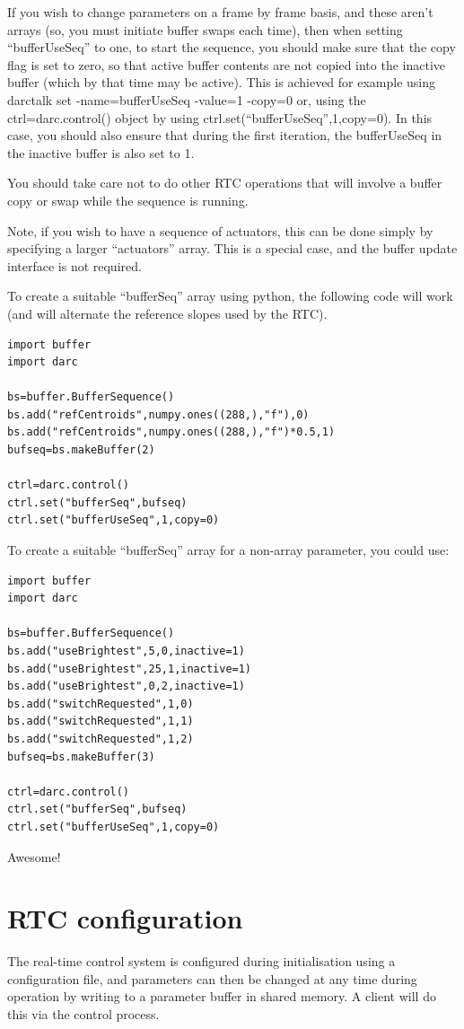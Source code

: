 \documentclass[a4,10pt]{article}
\begin{document}
If you wish to change parameters on a frame by frame basis, and these
aren't arrays (so, you must initiate buffer swaps each time), then
when setting ``bufferUseSeq'' to one, to start the sequence, you
should make sure that the copy flag is set to zero, so that active
buffer contents are not copied into the inactive buffer (which by that
time may be active).  This is achieved for example using
{\rm darctalk set -name=bufferUseSeq -value=1 -copy=0}  or, using the
{\rm ctrl=darc.control()} object by using {\rm
  ctrl.set(``bufferUseSeq'',1,copy=0)}.  In this case, you should also
ensure that during the first iteration, the bufferUseSeq in the
inactive buffer is also set to 1.

You should take care not to do other RTC operations that will involve
a buffer copy or swap while the sequence is running.

Note, if you wish to have a sequence of actuators, this can be done
simply by specifying a larger ``actuators'' array.  This is a special
case, and the buffer update interface is not required.

To create a suitable ``bufferSeq'' array using python, the following
code will work (and will alternate the reference slopes used by the RTC).

\begin{verbatim}
import buffer
import darc

bs=buffer.BufferSequence()
bs.add("refCentroids",numpy.ones((288,),"f"),0)
bs.add("refCentroids",numpy.ones((288,),"f")*0.5,1)
bufseq=bs.makeBuffer(2)

ctrl=darc.control()
ctrl.set("bufferSeq",bufseq)
ctrl.set("bufferUseSeq",1,copy=0)
\end{verbatim}

To create a suitable ``bufferSeq'' array for a non-array parameter,
you could use:
\begin{verbatim}
import buffer
import darc

bs=buffer.BufferSequence()
bs.add("useBrightest",5,0,inactive=1)
bs.add("useBrightest",25,1,inactive=1)
bs.add("useBrightest",0,2,inactive=1)
bs.add("switchRequested",1,0)
bs.add("switchRequested",1,1)
bs.add("switchRequested",1,2)
bufseq=bs.makeBuffer(3)

ctrl=darc.control()
ctrl.set("bufferSeq",bufseq)
ctrl.set("bufferUseSeq",1,copy=0)
\end{verbatim}

Awesome!




\section{RTC configuration}
The real-time control system is configured during initialisation using
a configuration file, and parameters can then be changed at
any time during operation by writing to a parameter buffer in shared
memory.  A client will do this via the control process.
\end{document}
